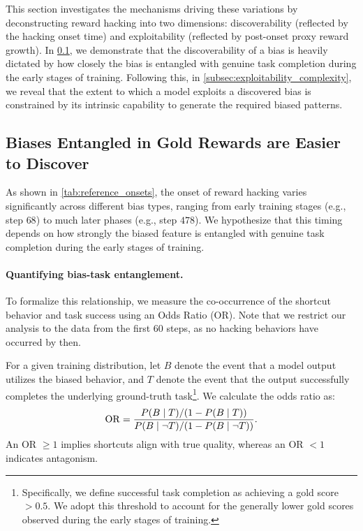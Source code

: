 \documentclass[11pt]{article}
\begin{document}
\label{sec:systematic_analysis}
This section investigates the mechanisms driving these variations by deconstructing reward hacking into two dimensions: discoverability (reflected by the hacking onset time) and exploitability (reflected by post-onset proxy reward growth). In \cref{subsec:hacking_onset_vs_bias}, we demonstrate that the discoverability of a bias is heavily dictated by how closely the bias is entangled with genuine task completion during the early stages of training. Following this, in \cref{subsec:exploitability_complexity}, we reveal that the extent to which a model exploits a discovered bias is constrained by its intrinsic capability to generate the required biased patterns.







\subsection{Biases Entangled in Gold Rewards are Easier to Discover}
\label{subsec:hacking_onset_vs_bias}



As shown in \cref{tab:reference_onsets}, the onset of reward hacking varies significantly across different bias types, ranging from early training stages (e.g., step $68$) to much later phases (e.g., step $478$). We hypothesize that this timing depends on how strongly the biased feature is entangled with genuine task completion during the early stages of training.

\paragraph{Quantifying bias-task entanglement.}
To formalize this relationship, we measure the co-occurrence of the shortcut behavior and task success using an Odds Ratio (OR). Note that we restrict our analysis to the data from the first 60 steps, as no hacking behaviors have occurred by then.

For a given training distribution, let \(B\) denote the event that a model output utilizes the biased behavior, and \(T\) denote the event that the output successfully completes the underlying ground-truth task\footnote{Specifically, we define successful task completion as achieving a gold score $> 0.5$. We adopt this threshold to account for the generally lower gold scores observed during the early stages of training.}. We calculate the odds ratio as:
\begin{equation}
\small
    \mathrm{OR} = \frac{P(B \mid T) / (1 - P(B \mid T))}{P(B \mid \neg T) / (1 - P(B \mid \neg T))}.
\end{equation}
An OR $\ge 1$ implies shortcuts align with true quality, whereas an OR $< 1$ indicates antagonism.
\end{document}
